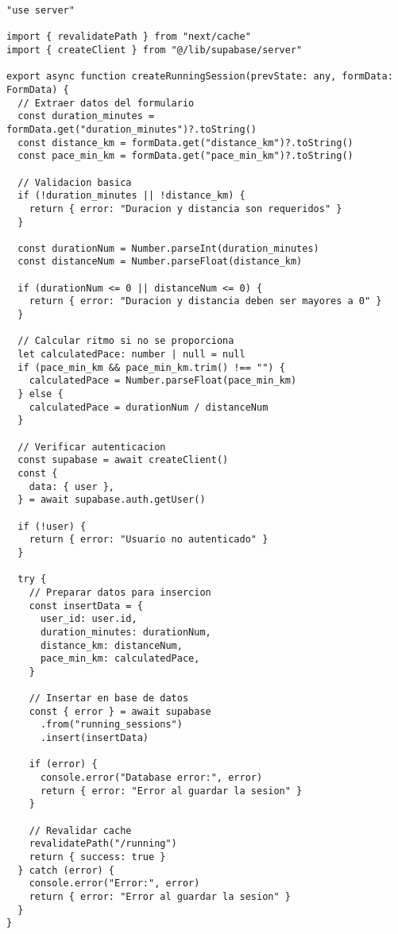 \documentclass[12pt,a4paper]{article}
\begin{document}
\begin{lstlisting}[caption=Funcion createRunningSession completa]
"use server"

import { revalidatePath } from "next/cache"
import { createClient } from "@/lib/supabase/server"

export async function createRunningSession(prevState: any, formData: FormData) {
  // Extraer datos del formulario
  const duration_minutes = formData.get("duration_minutes")?.toString()
  const distance_km = formData.get("distance_km")?.toString()
  const pace_min_km = formData.get("pace_min_km")?.toString()

  // Validacion basica
  if (!duration_minutes || !distance_km) {
    return { error: "Duracion y distancia son requeridos" }
  }

  const durationNum = Number.parseInt(duration_minutes)
  const distanceNum = Number.parseFloat(distance_km)

  if (durationNum <= 0 || distanceNum <= 0) {
    return { error: "Duracion y distancia deben ser mayores a 0" }
  }

  // Calcular ritmo si no se proporciona
  let calculatedPace: number | null = null
  if (pace_min_km && pace_min_km.trim() !== "") {
    calculatedPace = Number.parseFloat(pace_min_km)
  } else {
    calculatedPace = durationNum / distanceNum
  }

  // Verificar autenticacion
  const supabase = await createClient()
  const {
    data: { user },
  } = await supabase.auth.getUser()

  if (!user) {
    return { error: "Usuario no autenticado" }
  }

  try {
    // Preparar datos para insercion
    const insertData = {
      user_id: user.id,
      duration_minutes: durationNum,
      distance_km: distanceNum,
      pace_min_km: calculatedPace,
    }

    // Insertar en base de datos
    const { error } = await supabase
      .from("running_sessions")
      .insert(insertData)

    if (error) {
      console.error("Database error:", error)
      return { error: "Error al guardar la sesion" }
    }

    // Revalidar cache
    revalidatePath("/running")
    return { success: true }
  } catch (error) {
    console.error("Error:", error)
    return { error: "Error al guardar la sesion" }
  }
}
\end{lstlisting}
\end{document}
